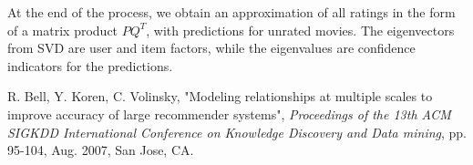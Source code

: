\documentclass{article}
\begin{document}
At the end of the process, we obtain an approximation of all ratings in the form of a matrix product
$PQ^T$, with predictions for unrated movies. The eigenvectors from SVD are user and item factors, while
the eigenvalues are confidence indicators for the predictions.

\begin{thebibliography}{9}
 R. Bell, Y. Koren, C. Volinsky, 
"Modeling relationships at multiple scales to improve accuracy of large recommender systems",
\textit{Proceedings of the 13th ACM SIGKDD International Conference on Knowledge Discovery and Data mining},
pp. 95-104, Aug. 2007, San Jose, CA.
\end{thebibliography}
\end{document}
